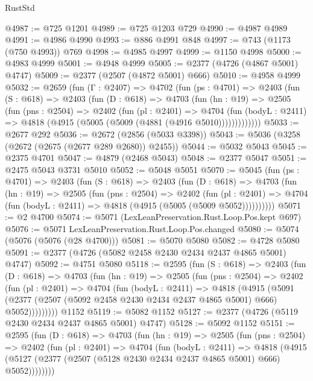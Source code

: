 \begin{lexlean}{RustStd}
\begin{coremodule}
@4987 := @725 @1201
@4989 := @725 @1203 @729
@4990 := @4987 @4989
@4991 := @4986 @4990
@4993 := @886 @4991 @848
@4997 := @743 (@1173 (@750 @4993)) @769
@4998 := @4985 @4997
@4999 := @1150 @4998
@5000 := @4983 @4999
@5001 := @4948 @4999
@5005 := @2377 (@4726 (@4867 @5001) @4747)
@5009 := @2377 (@2507 (@4872 @5001) @666)
@5010 := @4958 @4999
@5032 := @2659
    (fun (Γ : @2407) =>
    @4702
      (fun (ps : @4701) =>
      @2403
        (fun (S : @618) =>
        @2403
          (fun (D : @618) =>
          @4703
            (fun (hn : @19) =>
            @2505
              (fun (pns : @2504) =>
              @2402
                (fun (pl : @2401) =>
                @4704
                  (fun (bodyL : @2411) =>
                  @4818 (@4915 (@5005 (@5009 (@4881 (@4916 @5010)))))))))))))
@5033 := @2677 @292
@5036 := @2672 (@2856 (@5033 @3398))
@5043 := @5036 (@3258 (@2672 (@2675 (@2677 @289 @2680)) @2455))
@5044 := @5032 @5043
@5045 := @2375 @4701
@5047 := @4879 (@2468 @5043)
@5048 := @2377 @5047
@5051 := @2475 @5043 @3731 @5010
@5052 := @5048 @5051
@5070 := @5045
    (fun (ps : @4701) =>
    @2403
      (fun (S : @618) =>
      @2403
        (fun (D : @618) =>
        @4703
          (fun (hn : @19) =>
          @2505
            (fun (pns : @2504) =>
            @2402
              (fun (pl : @2401) =>
              @4704 (fun (bodyL : @2411) => @4818 (@4915 (@5005 (@5009 @5052))))))))))
@5071 := @2 @4700
@5074 := @5071 (LexLeanPreservation.Rust.Loop.Pos.kept @697)
@5076 := @5071 LexLeanPreservation.Rust.Loop.Pos.changed
@5080 := @5074 (@5076 (@5076 (@28 @4700)))
@5081 := @5070 @5080
@5082 := @4728 @5080
@5091 := @2377 (@4726 (@5082 @2458 @2430 @2434 @2437 @4865 @5001) @4747)
@5092 := @4751 @5080
@5118 := @2595
    (fun (S : @618) =>
    @2403
      (fun (D : @618) =>
      @4703
        (fun (hn : @19) =>
        @2505
          (fun (pns : @2504) =>
          @2402
            (fun (pl : @2401) =>
            @4704
              (fun (bodyL : @2411) =>
              @4818
                (@4915
                  (@5091
                    (@2377 (@2507 (@5092 @2458 @2430 @2434 @2437 @4865 @5001) @666) @5052)))))))))
    @1152
@5119 := @5082 @1152
@5127 := @2377 (@4726 (@5119 @2430 @2434 @2437 @4865 @5001) @4747)
@5128 := @5092 @1152
@5151 := @2595
    (fun (D : @618) =>
    @4703
      (fun (hn : @19) =>
      @2505
        (fun (pns : @2504) =>
        @2402
          (fun (pl : @2401) =>
          @4704
            (fun (bodyL : @2411) =>
            @4818
              (@4915 (@5127 (@2377 (@2507 (@5128 @2430 @2434 @2437 @4865 @5001) @666) @5052))))))))

\end{coremodule}
\end{lexlean}
